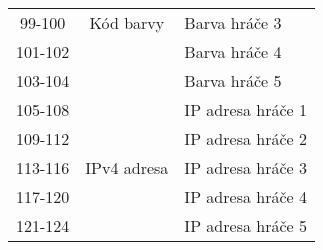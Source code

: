 \begin{table}[hbtp]
\begin{tabular}{|c|c|l|}
99-100  & Kód barvy   & Barva hráče 3                                                   \\ \cline{1-1} \cline{3-3}
101-102 &             & Barva hráče 4                                                   \\ \cline{1-1} \cline{3-3}
103-104 &             & Barva hráče 5                                                   \\ \hline
105-108 &             & IP adresa hráče 1                                               \\ \cline{1-1} \cline{3-3}
109-112 &             & IP adresa hráče 2                                               \\ \cline{1-1} \cline{3-3}
113-116 & IPv4 adresa & IP adresa hráče 3                                               \\ \cline{1-1} \cline{3-3}
117-120 &             & IP adresa hráče 4                                               \\ \cline{1-1} \cline{3-3}
121-124 &             & IP adresa hráče 5                                               \\ \hline
\end{tabular}
\end{table}
